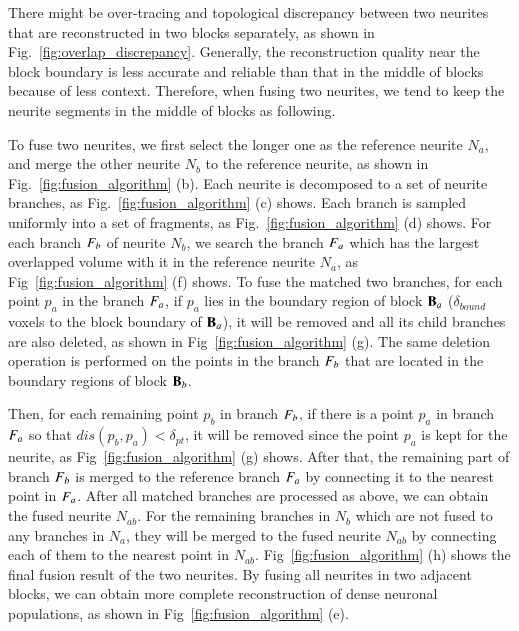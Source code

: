 There might be over-tracing and topological discrepancy between two neurites that are reconstructed in two blocks separately, as shown in Fig.~\ref{fig:overlap_discrepancy}.
Generally, the reconstruction quality near the block boundary is less accurate and reliable than that in the middle of blocks because of less context. 
Therefore, when fusing two neurites, we tend to keep the neurite segments in the middle of blocks as following.
  
To fuse two neurites, we first select the longer one as the reference neurite $N_a$, and merge the other neurite $N_b$ to the reference neurite, as shown in Fig.~\ref{fig:fusion_algorithm} (b).
%
Each neurite is decomposed to a set of neurite branches, as Fig.~\ref{fig:fusion_algorithm} (c) shows.
Each branch is sampled uniformly into a set of fragments, as Fig.~\ref{fig:fusion_algorithm} (d) shows.
%
For each branch $F_b$ of neurite $N_b$, we search the branch $F_a$ which has the largest overlapped volume with it in the reference neurite $N_a$, as Fig~\ref{fig:fusion_algorithm} (f) shows.
To fuse the matched two branches, for each point $p_a$ in the branch $F_a$, if $p_a$ lies in the boundary region of block $\mathbf{B}_a$ ($\delta_{bound}$ voxels to the block boundary of $\mathbf{B}_a$), it will be removed and all its child branches are also deleted, as shown in Fig~\ref{fig:fusion_algorithm} (g).  
The same deletion operation is performed on the points in the branch $F_b$ that are located in the boundary regions of block $\mathbf{B}_b$.


Then, for each remaining point $p_b$ in branch $F_b$, if there is a point $p_a$ in branch $F_a$ so that $dis(p_b,p_a)<\delta_{pt}$, it will be removed since the point $p_a$ is kept for the neurite, as Fig~\ref{fig:fusion_algorithm} (g) shows.
%
After that, the remaining part of branch $F_b$ is merged to the reference branch $F_a$ by connecting it to the nearest point in $F_a$.
After all matched branches are processed as above, we can obtain the fused neurite $N_{ab}$.
%
For the remaining branches in $N_b$ which are not fused to any branches in $N_a$, they will be merged to the fused neurite $N_{ab}$ by connecting each of them to the nearest point in $N_{ab}$.
%
Fig~\ref{fig:fusion_algorithm} (h) shows the final fusion result of the two neurites. 
By fusing all neurites in two adjacent blocks, we can obtain more complete reconstruction of dense neuronal populations, as shown in Fig~\ref{fig:fusion_algorithm} (e).


